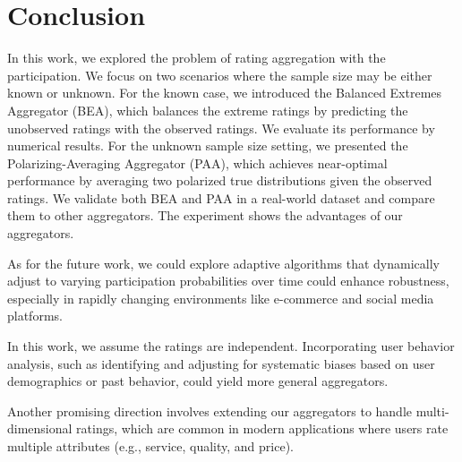 \section{Conclusion}
In this work, we explored the problem of rating aggregation with the participation. We focus on two scenarios where the sample size may be either known or unknown. For the known case, we introduced the Balanced Extremes Aggregator (BEA), which balances the extreme ratings by predicting the unobserved ratings with the observed ratings. We evaluate its performance by numerical results. For the unknown sample size setting, we presented the Polarizing-Averaging Aggregator (PAA), which achieves near-optimal performance by averaging two polarized true distributions given the observed ratings. We validate both BEA and PAA in a real-world dataset and compare them to other aggregators. The experiment shows the advantages of our aggregators.

As for the future work, we could explore adaptive algorithms that dynamically adjust to varying participation probabilities over time could enhance robustness, especially in rapidly changing environments like e-commerce and social media platforms.

In this work, we assume the ratings are independent. Incorporating user behavior analysis, such as identifying and adjusting for systematic biases based on user demographics or past behavior, could yield more general aggregators.

Another promising direction involves extending our aggregators to handle multi-dimensional ratings, which are common in modern applications where users rate multiple attributes (e.g., service, quality, and price).
